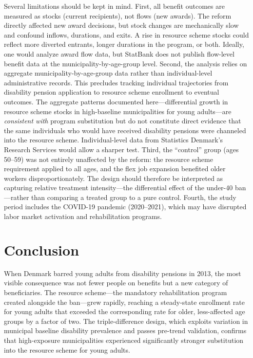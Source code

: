 \documentclass[12pt]{article}
\begin{document}
Several limitations should be kept in mind. First, all benefit outcomes are measured as stocks (current recipients), not flows (new awards). The reform directly affected new award decisions, but stock changes are mechanically slow and confound inflows, durations, and exits. A rise in resource scheme stocks could reflect more diverted entrants, longer durations in the program, or both. Ideally, one would analyze award flow data, but StatBank does not publish flow-level benefit data at the municipality-by-age-group level. Second, the analysis relies on aggregate municipality-by-age-group data rather than individual-level administrative records. This precludes tracking individual trajectories from disability pension application to resource scheme enrollment to eventual outcomes. The aggregate patterns documented here---differential growth in resource scheme stocks in high-baseline municipalities for young adults---are \textit{consistent with} program substitution but do not constitute direct evidence that the same individuals who would have received disability pensions were channeled into the resource scheme. Individual-level data from Statistics Denmark's Research Services would allow a sharper test. Third, the ``control'' group (ages 50--59) was not entirely unaffected by the reform: the resource scheme requirement applied to all ages, and the flex job expansion benefited older workers disproportionately. The design should therefore be interpreted as capturing relative treatment intensity---the differential effect of the under-40 ban---rather than comparing a treated group to a pure control. Fourth, the study period includes the COVID-19 pandemic (2020--2021), which may have disrupted labor market activation and rehabilitation programs.


\section{Conclusion}
\label{sec:conclusion}

When Denmark barred young adults from disability pensions in 2013, the most visible consequence was not fewer people on benefits but a new category of beneficiaries. The resource scheme---the mandatory rehabilitation program created alongside the ban---grew rapidly, reaching a steady-state enrollment rate for young adults that exceeded the corresponding rate for older, less-affected age groups by a factor of two. The triple-difference design, which exploits variation in municipal baseline disability prevalence and passes pre-trend validation, confirms that high-exposure municipalities experienced significantly stronger substitution into the resource scheme for young adults.
\end{document}
